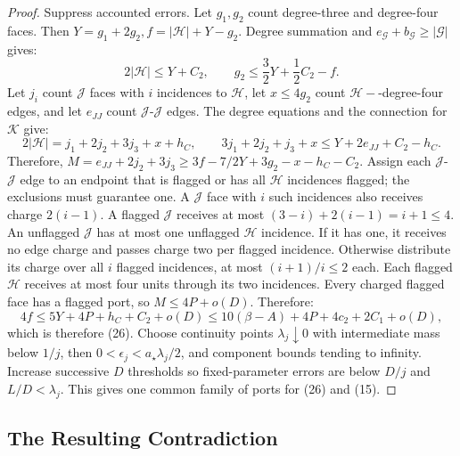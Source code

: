 \documentclass[10pt,reqno]{amsart}
\begin{document}
\begin{proof}
    Suppress accounted errors. Let $g_1, g_2$ count degree-three and degree-four faces. Then $Y = g_1 + 2g_2, f = |\mathcal{H}| + Y - g_2$. Degree summation and $e_\mathcal{G} + b_\mathcal{G} \ge |\mathcal{G}|$ gives:
    \begin{equation}
        2 | \mathcal{H} | \le Y + C_2, \qquad g_2 \le \frac{3}{2} Y + \frac{1}{2} C_2 - f.
    \end{equation}
    Let $j_i$ count $\mathcal{J}$ faces with $i$ incidences to $\mathcal{H}$, let $x \le 4 g_2$ count $\mathcal{H}-$-degree-four edges, and let $e_{JJ}$ count $\mathcal{J}$-$\mathcal{J}$ edges. The degree equations and the connection for $\mathcal{K}$ give:
    \begin{equation}
        2 | \mathcal{H}| = j_1 + 2j_2 + 3j_3 + x + h_C, \qquad 3 j_1 + 2 j_2 + j_3 + x \le Y + 2 e_{JJ} + C_2 - h_C.
    \end{equation}
    Therefore, $M = e_{JJ} + 2j_2 + 3j_3 \ge 3f - 7/2 Y + 3 g_2 - x - h_C - C_2$. Assign each $\mathcal{J}$-$\mathcal{J}$ edge to an endpoint that is flagged or has all $\mathcal{H}$ incidences flagged; the exclusions must guarantee one. A $\mathcal{J}$ face with $i$ such incidences also receives charge $2(i - 1)$. A flagged $\mathcal{J}$ receives at most $(3 - i) + 2(i - 1) = i + 1 \le 4$. An unflagged $\mathcal{J}$ has at most one unflagged $\mathcal{H}$ incidence. If it has one, it receives no edge charge and passes charge two per flagged incidence. Otherwise distribute its charge over all $i$ flagged incidences, at most $(i + 1) / i \le 2$ each. Each flagged $\mathcal{H}$ receives at most four units through its two incidences. Every charged flagged face has a flagged port, so $M \le 4P + o(D)$. Therefore:
    \begin{equation}
        4f \le 5Y + 4P + h_C + C_2 + o(D) \le 10(\beta - A) + 4P + 4c_2 + 2C_1 + o(D),
    \end{equation}
    which is therefore (26). Choose continuity points $\lambda_j \downarrow 0$ with intermediate mass below $1 / j$, then $0 < \epsilon_j < a_\star \lambda_j / 2$, and component bounds tending to infinity. Increase successive $D$ thresholds so fixed-parameter errors are below $D / j$ and $L / D < \lambda_j$. This gives one common family of ports for (26) and (15).
\end{proof}





\subsection{The Resulting Contradiction}
\end{document}
